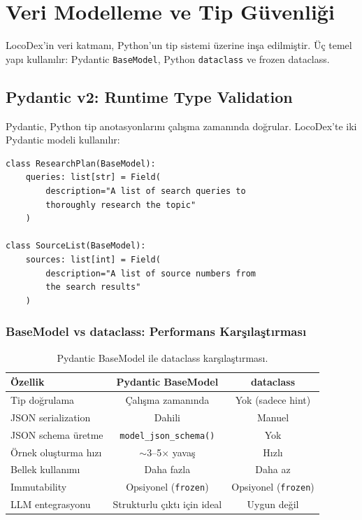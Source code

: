 \section{Veri Modelleme ve Tip G\"{u}venli\u{g}i}
\label{sec:data-modeling}

LocoDex'in veri katman{\i}, Python'un tip sistemi \"{u}zerine in\c{s}a edilmi\c{s}tir. \"{U}\c{c} temel yap{\i} kullan{\i}l{\i}r: Pydantic \texttt{BaseModel}, Python \texttt{dataclass} ve frozen dataclass.

\subsection{Pydantic v2: Runtime Type Validation}

Pydantic, Python tip anotasyonlar{\i}n{\i} \c{c}al{\i}\c{s}ma zaman{\i}nda do\u{g}rular. LocoDex'te iki Pydantic modeli kullan{\i}l{\i}r:

\begin{verbatim}
class ResearchPlan(BaseModel):
    queries: list[str] = Field(
        description="A list of search queries to
        thoroughly research the topic"
    )

class SourceList(BaseModel):
    sources: list[int] = Field(
        description="A list of source numbers from
        the search results"
    )
\end{verbatim}

\subsubsection{BaseModel vs dataclass: Performans Kar\c{s}{\i}la\c{s}t{\i}rmas{\i}}

\begin{table}[H]
\centering
\caption{Pydantic BaseModel ile dataclass kar\c{s}{\i}la\c{s}t{\i}rmas{\i}.}
\label{tab:basemodel-vs-dataclass}
\begin{tabular}{lcc}
\toprule
\textbf{\"{O}zellik} & \textbf{Pydantic BaseModel} & \textbf{dataclass} \\
\midrule
Tip do\u{g}rulama & \c{C}al{\i}\c{s}ma zaman{\i}nda & Yok (sadece hint) \\
JSON serialization & Dahili & Manuel \\
JSON schema \"{u}retme & \texttt{model\_json\_schema()} & Yok \\
\"{O}rnek olu\c{s}turma h{\i}z{\i} & $\sim$3--5$\times$ yava\c{s} & H{\i}zl{\i} \\
Bellek kullan{\i}m{\i} & Daha fazla & Daha az \\
Immutability & Opsiyonel (\texttt{frozen}) & Opsiyonel (\texttt{frozen}) \\
LLM entegrasyonu & Strukturlu \c{c}{\i}kt{\i} i\c{c}in ideal & Uygun de\u{g}il \\
\bottomrule
\end{tabular}
\end{table}

